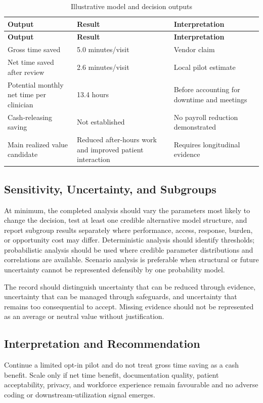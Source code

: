 \begin{longtable}{@{}p{}p{}p{}@{}}
\caption{Illustrative model and decision outputs}
\label{tab:comp-ch04-outputs}\\
\toprule
\textbf{Output} & \textbf{Result} & \textbf{Interpretation} \\
\midrule
\endfirsthead
\toprule
\textbf{Output} & \textbf{Result} & \textbf{Interpretation} \\
\midrule
\endhead
\bottomrule
\endlastfoot
Gross time saved & 5.0 minutes/visit & Vendor claim \\
Net time saved after review & 2.6 minutes/visit & Local pilot estimate \\
Potential monthly net time per clinician & 13.4 hours & Before accounting for downtime and meetings \\
Cash-releasing saving & Not established & No payroll reduction demonstrated \\
Main realized value candidate & Reduced after-hours work and improved patient interaction & Requires longitudinal evidence \\
\end{longtable}

\subsection{Sensitivity, Uncertainty, and Subgroups}
At minimum, the completed analysis should vary the parameters most likely to
change the decision, test at least one credible alternative model structure, and
report subgroup results separately where performance, access, response, burden,
or opportunity cost may differ. Deterministic analysis should identify thresholds;
probabilistic analysis should be used where credible parameter distributions and
correlations are available. Scenario analysis is preferable when structural or
future uncertainty cannot be represented defensibly by one probability model.

The record should distinguish uncertainty that can be reduced through evidence,
uncertainty that can be managed through safeguards, and uncertainty that remains
too consequential to accept. Missing evidence should not be represented as an
average or neutral value without justification.

\subsection{Interpretation and Recommendation}
Continue a limited opt-in pilot and do not treat gross time saving as a cash benefit. Scale only if net time benefit, documentation quality, patient acceptability, privacy, and workforce experience remain favourable and no adverse coding or downstream-utilization signal emerges.

